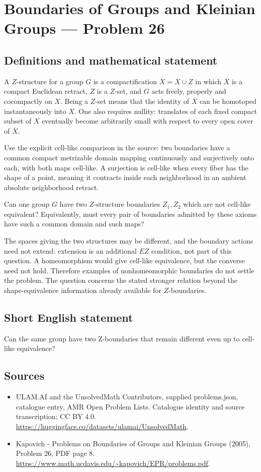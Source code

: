 \documentclass[11pt,a4paper]{article}
\begin{document}
\section*{Boundaries of Groups and Kleinian Groups — Problem 26}\label{statement}

\subsection{Definitions and mathematical statement}
A $Z$-structure for a group $G$ is a compactification $\overline X=X\cup Z$ in which $\overline X$ is a compact Euclidean retract, $Z$ is a $Z$-set, and $G$ acts freely, properly and cocompactly on $X$. Being a $Z$-set means that the identity of $\overline X$ can be homotoped instantaneously into $X$. One also requires nullity: translates of each fixed compact subset of $X$ eventually become arbitrarily small with respect to every open cover of $\overline X$.

Use the explicit cell-like comparison in the source: two boundaries have a common compact metrizable domain mapping continuously and surjectively onto each, with both maps cell-like. A surjection is cell-like when every fiber has the shape of a point, meaning it contracts inside each neighborhood in an ambient absolute neighborhood retract.

Can one group $G$ have two $Z$-structure boundaries $Z_1,Z_2$ which are not cell-like equivalent? Equivalently, must every pair of boundaries admitted by these axioms have such a common domain and such maps?

The spaces giving the two structures may be different, and the boundary actions need not extend: extension is an additional $EZ$ condition, not part of this question. A homeomorphism would give cell-like equivalence, but the converse need not hold. Therefore examples of nonhomeomorphic boundaries do not settle the problem. The question concerns the stated stronger relation beyond the shape-equivalence information already available for $Z$-boundaries.
\subsection{Short English statement}
Can the same group have two Z-boundaries that remain different even up to cell-like equivalence?
\subsection{Sources}
\begin{itemize}
\item[S1] ULAM.AI and the UnsolvedMath Contributors, supplied problems.json, catalogue entry, AMR Open Problem Lists. Catalogue identity and source transcription; CC BY 4.0.
\url{https://huggingface.co/datasets/ulamai/UnsolvedMath}.
\item[S2] Kapovich - Problems on Boundaries of Groups and Kleinian Groups (2005), Problem 26, PDF page 8. 
\url{https://www.math.ucdavis.edu/~kapovich/EPR/problems.pdf}.
\end{itemize}
\end{document}
